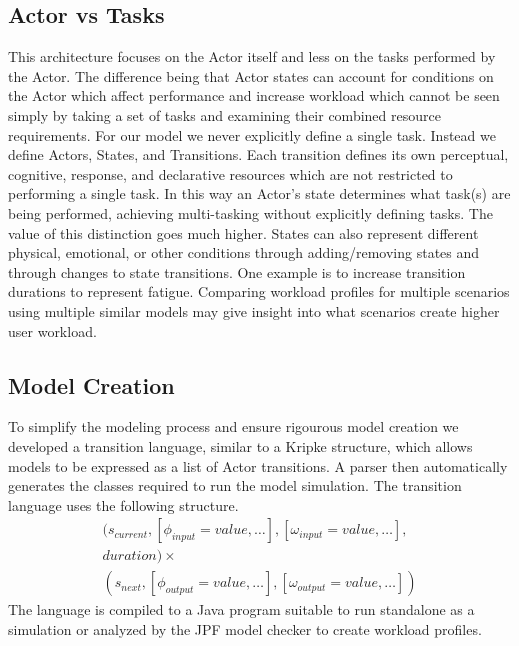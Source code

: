 \subsection{Actor vs Tasks}
This architecture focuses on the Actor itself and less on the tasks performed by
the Actor.  The difference being that Actor states can account for conditions on
the Actor which affect performance and increase workload which cannot be seen
simply by taking a set of tasks and examining their combined resource
requirements.  For our model we never explicitly define a single task.  Instead
we define Actors, States, and Transitions.  Each transition defines its own
perceptual, cognitive, response, and declarative resources \cite{salvucci2008threaded} which are
not restricted to performing a single task.  In this way an Actor's state
determines what task(s) are being performed, achieving multi-tasking without
explicitly defining tasks.  The value of this distinction goes much higher. 
States can also represent different physical, emotional, or other conditions
through adding/removing states and through changes to state transitions. One
example is to increase transition durations to represent fatigue.
Comparing workload profiles for multiple scenarios using multiple
similar models may give insight into what scenarios create higher user workload.

\subsection{Model Creation}
To simplify the modeling process and ensure rigourous model creation we
developed a transition language, similar to a Kripke structure, which allows
models to be expressed as a list of Actor transitions.  A parser then
automatically generates the classes required to run the model simulation.
The transition language uses the following structure.
\begin{equation}
\begin{split}
(s_{current}, [\phi_{input} = value,\ldots], [\omega_{input} = value,\ldots],\\
duration) \times \\
(s_{next}, [\phi_{output} =
value,\ldots], [\omega_{output} = value,\ldots])
\end{split}
\end{equation}
\noindent The language is compiled to a Java program suitable to run standalone
as a simulation or analyzed by the JPF model checker to create
workload profiles.
